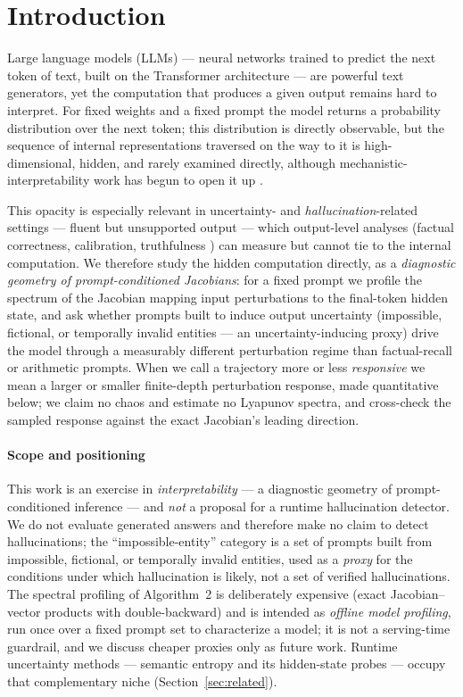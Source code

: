 \documentclass{article}
\begin{document}
\section{Introduction}
\label{sec:intro}

Large language models (LLMs) --- neural networks trained to predict the next token of text,
built on the Transformer architecture \cite{vaswani2017attention} --- are powerful text
generators, yet the computation that produces a given output remains hard to interpret. For
fixed weights and a fixed prompt the model returns a probability distribution over the next
token; this distribution is directly observable, but the sequence of internal representations
traversed on the way to it is high-dimensional, hidden, and rarely examined directly, although
mechanistic-interpretability work has begun to open it up \cite{elhage2021mathematical}.

This opacity is especially relevant in uncertainty- and \emph{hallucination}-related settings --- fluent but unsupported output
\cite{ji2023survey} --- which output-level analyses (factual correctness, calibration,
truthfulness \cite{lin2022truthfulqa}) can measure but cannot tie to the internal computation. We
therefore study the hidden computation directly, as a \emph{diagnostic geometry of
prompt-conditioned Jacobians}: for a fixed prompt we profile the spectrum of the Jacobian mapping
input perturbations to the final-token hidden state, and ask whether prompts built to induce output
uncertainty (impossible, fictional, or temporally invalid entities --- an uncertainty-inducing
proxy) drive the model through a measurably different perturbation regime than factual-recall or
arithmetic prompts. When we call a trajectory more or less \emph{responsive} we mean a larger or
smaller finite-depth perturbation response, made quantitative below; we claim no chaos and estimate
no Lyapunov spectra, and cross-check the sampled response against the exact Jacobian's leading
direction.

\paragraph{Scope and positioning}
This work is an exercise in \emph{interpretability} --- a diagnostic geometry of
prompt-conditioned inference --- and \emph{not} a proposal for a runtime hallucination
detector. We do not evaluate generated answers and therefore make no claim to detect
hallucinations; the ``impossible-entity'' category is a set of prompts built from impossible,
fictional, or temporally invalid entities, used as a \emph{proxy} for the conditions under
which hallucination is likely, not a set of verified hallucinations. The spectral profiling of
Algorithm~2 is deliberately expensive (exact Jacobian--vector products with double-backward)
and is intended as \emph{offline model profiling}, run once over a fixed prompt set to
characterize a model; it is not a serving-time guardrail, and we discuss cheaper proxies only
as future work. Runtime uncertainty methods --- semantic entropy and its hidden-state probes
--- occupy that complementary niche (Section~\ref{sec:related}).
\end{document}
